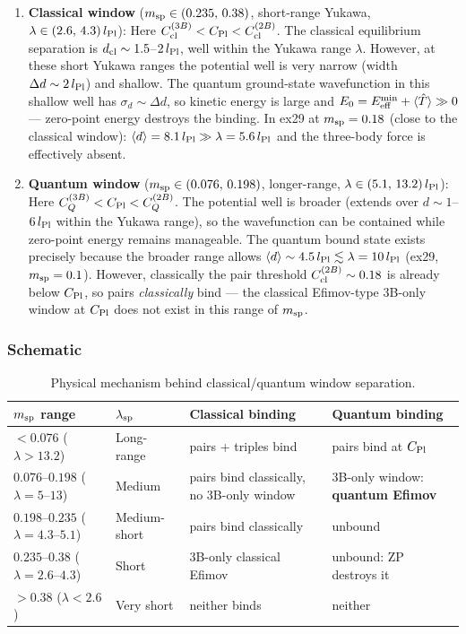 \begin{enumerate}
\item \textbf{Classical window} ($m_{\rm sp}\in(0.235,\,0.38)$, short-range
  Yukawa, $\lambda\in(2.6,\,4.3)\,l_{\rm Pl}$):
  Here $C_{\rm cl}^{(3B)}<C_{\rm Pl}<C_{\rm cl}^{(2B)}$.
  The classical equilibrium separation is $d_{\rm cl}\sim1.5$--$2\,l_{\rm Pl}$,
  well within the Yukawa range $\lambda$.
  However, at these short Yukawa ranges the potential well is very narrow
  (width $\Delta d\sim2\,l_{\rm Pl}$) and shallow.
  The quantum ground-state wavefunction in this shallow well has
  $\sigma_d\sim\Delta d$, so kinetic energy is large and
  $E_0 = E_{\rm eff}^{\rm min} + \langle\hat{T}\rangle \gg 0$ —
  zero-point energy destroys the binding.
  In ex29 at $m_{\rm sp}=0.18$ (close to the classical window):
  $\langle d\rangle=8.1\,l_{\rm Pl}\gg\lambda=5.6\,l_{\rm Pl}$ and
  the three-body force is effectively absent.

\item \textbf{Quantum window} ($m_{\rm sp}\in(0.076,\,0.198)$, longer-range,
  $\lambda\in(5.1,\,13.2)\,l_{\rm Pl}$):
  Here $C_Q^{(3B)}<C_{\rm Pl}<C_Q^{(2B)}$.
  The potential well is broader (extends over $d\sim1$--$6\,l_{\rm Pl}$
  within the Yukawa range), so the wavefunction can be contained while
  zero-point energy remains manageable.
  The quantum bound state exists precisely because the broader range allows
  $\langle d\rangle\sim4.5\,l_{\rm Pl}\lesssim\lambda=10\,l_{\rm Pl}$
  (ex29, $m_{\rm sp}=0.1$).
  However, classically the pair threshold $C_{\rm cl}^{(2B)}\sim0.18$
  is already below $C_{\rm Pl}$, so pairs \emph{classically} bind —
  the classical Efimov-type 3B-only window at $C_{\rm Pl}$ does not exist
  in this range of $m_{\rm sp}$.
\end{enumerate}

\subsubsection{Schematic}

\begin{table}[h]
\centering
\caption{Physical mechanism behind classical/quantum window separation.}
\label{tab:nonoverlap_mechanism}
\begin{tabular}{p{3cm}p{4cm}p{4.5cm}p{2.5cm}}
\hline
$m_{\rm sp}$ range & $\lambda_{\rm sp}$ & Classical binding & Quantum binding \\
\hline
$<0.076$ ($\lambda>13.2$) & Long-range & pairs + triples bind & pairs bind at $C_{\rm Pl}$ \\
$0.076$--$0.198$ ($\lambda=5$--$13$) & Medium & pairs bind classically, no 3B-only window & 3B-only window: \textbf{quantum Efimov} \\
$0.198$--$0.235$ ($\lambda=4.3$--$5.1$) & Medium-short & pairs bind classically & unbound \\
$0.235$--$0.38$ ($\lambda=2.6$--$4.3$) & Short & 3B-only classical Efimov & unbound: ZP destroys it \\
$>0.38$ ($\lambda<2.6$) & Very short & neither binds & neither \\
\hline
\end{tabular}
\end{table}

